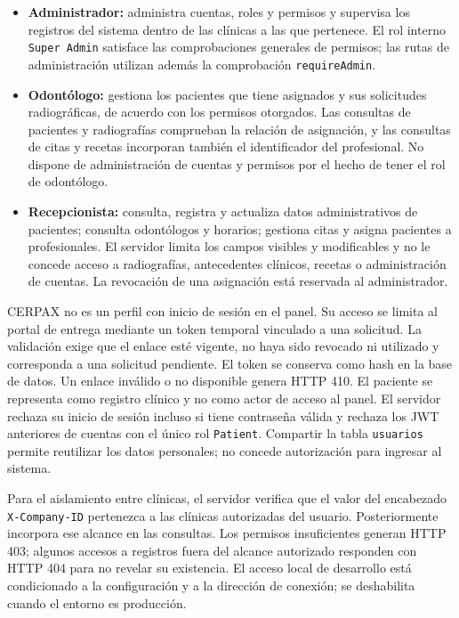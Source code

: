 \documentclass[12pt,letterpaper]{report}
\begin{document}
\begin{itemize}
  \item \textbf{Administrador:} administra cuentas, roles y permisos y
  supervisa los registros del sistema dentro de las clínicas a las que
  pertenece. El rol interno \texttt{Super Admin} satisface las comprobaciones
  generales de permisos; las rutas de administración utilizan además la
  comprobación \texttt{requireAdmin}.

  \item \textbf{Odontólogo:} gestiona los pacientes que tiene asignados
  y sus solicitudes radiográficas, de acuerdo con los permisos otorgados.
  Las consultas de pacientes y radiografías comprueban la relación de
  asignación, y las consultas de citas y recetas incorporan también el
  identificador del profesional. No dispone de administración de cuentas
  y permisos por el hecho de tener el rol de odontólogo.

  \item \textbf{Recepcionista:} consulta, registra y actualiza datos
  administrativos de pacientes; consulta odontólogos y horarios; gestiona
  citas y asigna pacientes a profesionales. El servidor limita los campos
  visibles y modificables y no le concede acceso a radiografías,
  antecedentes clínicos, recetas o administración de cuentas. La
  revocación de una asignación está reservada al administrador.
\end{itemize}

CERPAX no es un perfil con inicio de sesión en el panel. Su acceso se limita
al portal de entrega mediante un token temporal vinculado a una solicitud.
La validación exige que el enlace esté vigente, no haya sido revocado ni
utilizado y corresponda a una solicitud pendiente. El token se conserva
como hash en la base de datos. Un enlace inválido o no disponible genera
HTTP 410. El paciente se representa como registro clínico y no como actor
de acceso al panel. El servidor rechaza su inicio de sesión incluso si tiene
contraseña válida y rechaza los JWT anteriores de cuentas con el único rol
\texttt{Patient}. Compartir la tabla \texttt{usuarios} permite reutilizar los
datos personales; no concede autorización para ingresar al sistema.

Para el aislamiento entre clínicas, el servidor verifica que el valor del
encabezado \texttt{X-Company-ID} pertenezca a las clínicas autorizadas del
usuario. Posteriormente incorpora ese alcance en las consultas. Los
permisos insuficientes generan HTTP 403; algunos accesos a registros fuera
del alcance autorizado responden con HTTP 404 para no revelar su existencia.
El acceso local de desarrollo está condicionado a la configuración y a
la dirección de conexión; se deshabilita cuando el entorno es producción.
\end{document}
